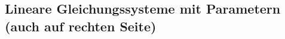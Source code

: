 \subsection{Lineare Gleichungssysteme mit Parametern (auch auf rechten Seite)}
\label{sec:lineare_parameter}
